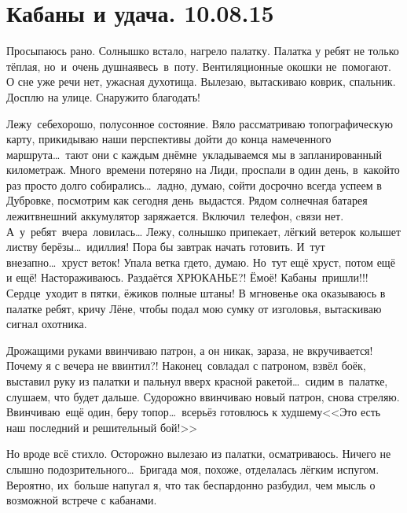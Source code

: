 \chapter{Кабаны и удача. 10.08.15}

Просыпаюсь рано. Солнышко встало, нагрело палатку. Палатка у ребят не только тёплая, но~и~очень душная\mdash весь~в~поту. Вентиляционные окошки не~помогают. О сне уже речи нет, ужасная духотища. Вылезаю, вытаскиваю коврик, спальник. Досплю на улице. Снаружи\sdash то благодать! 

Лежу~себе\mdash хорошо, полусонное состояние. Вяло рассматриваю топографическую карту, прикидываю наши перспективы дойти до конца намеченного маршрута\ldots~тают они с каждым днём\mdash не~укладываемся мы в запланированный километраж. Много~времени потеряно на Лиди, проспали в один день, в~какой\sdash то раз просто долго собирались\ldots~ладно, думаю, сойти досрочно всегда успеем в Дубровке, посмотрим как сегодня день~выдастся. Рядом солнечная батарея лежит\mdash внешний аккумулятор заряжается. Включил~телефон, cвязи нет. А~у~ребят~вчера~ловилась\ldots 
\newpage
Лежу, солнышко припекает, лёгкий ветерок колышет листву берёзы\ldots~идиллия! Пора бы завтрак начать готовить. И~тут внезапно\ldots~хруст веток! Упала ветка где\sdash то, думаю. Но~тут ещё хруст, потом ещё и ещё! Настораживаюсь. Раздаётся ХРЮКАНЬЕ?! Ё\sdash моё! Кабаны~пришли!!! Сердце~уходит в пятки, ёжиков полные штаны! В мгновенье ока оказываюсь в палатке ребят, кричу Лёне, чтобы подал мою сумку от изголовья, вытаскиваю сигнал охотника. 

Дрожащими руками ввинчиваю патрон, а он никак, зараза, не вкручивается! Почему я с вечера не ввинтил?! Наконец~совладал с патроном, взвёл боёк, выставил руку из палатки и пальнул вверх красной ракетой\ldots~сидим в~палатке, слушаем, что будет дальше. Судорожно ввинчиваю новый патрон, снова стреляю. Ввинчиваю~ещё один, беру топор\ldots~всерьёз готовлюсь к худшему\mdash <<Это есть наш последний и решительный бой!>> 

Но вроде всё стихло. Осторожно вылезаю из палатки, осматриваюсь. Ничего не слышно подозрительного\ldots~Бригада моя, похоже, отделалась лёгким испугом. Вероятно, их~больше напугал я, что так беспардонно разбудил, чем мысль о возможной встрече с кабанами.

